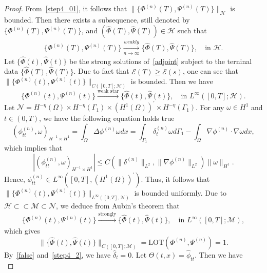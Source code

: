 \documentclass[10pt]{elsarticle}
\begin{document}
\begin{proof}
From~\eqref{step4_01}, it follows that $\|\{\Phi^{(n)}(T), \Psi^{(n)}(T)\}\|_{\mathcal{H}}$ is bounded. Then there exists a subsequence, still denoted by $\{\Phi^{(n)}(T), \Psi^{(n)}(T)\}$, and $(\hat{\Phi}(T), \hat{\Psi}(T))\in\mathcal{H}$ such that
\begin{eqnarray*}
	\{\Phi^{(n)}(T), \Psi^{(n)}(T)\}\xrightarrow[n\rightarrow\infty]{weakly} \{\hat{\Phi}(T), \hat{\Psi}(T)\},\quad \textrm{in $\mathcal{H}$}.
\end{eqnarray*}
Let $\{\hat{\Phi}(t), \hat{\Psi}(t)\}$ be the strong solutions of~\eqref{adjoint} subject to the terninal data $\{\hat{\Phi}(T), \hat{\Psi}(T)\}$. Due to fact that $\mathcal{E}(T)\geqslant \mathcal{E}(s)$, one can see that $\|\{\Phi^{(n)}(t), \Psi^{(n)}(t)\}\|_{C([0, T]; \mathcal{H})}$ is bounded. Then we have
\begin{equation}\label{step4_2}
	\{\Phi^{(n)}(t), \Psi^{(n)}(t)\}\xrightarrow{\textrm{weak star}} \{\hat{\Phi}(t), \hat{\Psi}(t)\},\quad \textrm{in $L^{\infty}([0, T]; \mathcal{H})$}.
\end{equation}
Let $\mathcal{N}=H^{-\eta}(\Omega)\times H^{-\eta}(\Gamma_1)\times (H^{1}(\Omega))^{\prime}\times H^{-\eta}(\Gamma_1)$. For any $\omega\in H^1$ and $t\in(0, T)$, we have the following equation holds true
\[
 (\phi^{(n)}_{tt}, \omega)_{H^{-1}\times H^1} =\int_{\Omega}\Delta \phi^{(n)} \omega dx = \int_{\Gamma_1}\delta^{(n)}_t\omega d\Gamma_1-\int_{\Omega}\nabla \phi^{(n)}\cdot \nabla\omega dx, 
 \]
 which implies that  
 \[
 	|(\phi^{(n)}_{tt}, \omega)_{H^{-1}\times H^1}|\leq C(\|\delta^{(n)}\|_{L^2}, \|\nabla\phi^{(n)}\|_{L^2})\|\omega\|_{H^1}.
\]
Hence, $\phi^{(n)}_{tt}\in L^{\infty}([0, T], (H^{1}(\Omega))^{\prime})$. Thus, it follows that $\|\{\Phi^{(n)}(t), \Psi^{(n)}(t)\}\|_{L^{\infty}([0, T], \mathcal{N})}$ is bounded uniformly. Due to $\mathcal{H}\subset\subset\mathcal{M}\subset\mathcal{N}$, we deduce from Aubin's theorem \cite{Simon} that
 \begin{eqnarray*}
	\{\Phi^{(n)}(t), \Psi^{(n)}(t)\}\xrightarrow{\textrm{strongly}} \{\hat{\Phi}(t), \hat{\Psi}(t)\},\quad \textrm{in $L^{\infty}([0, T]; \mathcal{M})$},
\end{eqnarray*} 
which gives
\begin{equation}\label{step4_3}
\|\{\hat{\Phi}(t), \hat{\Psi}(t)\}\|_{C([0, T]; \mathcal{M})}=\textrm{LOT}(\Phi^{(n)}, \Psi^{(n)}) =1.
\end{equation} 
By~\eqref{false} and~\eqref{step4_2}, we have $\hat{\delta}_t =0$. Let $\Theta(t, x)=\hat{\phi}_{tt}$. Then we have
\begin{equation*}

\end{equation*}
\end{proof}
\end{document}
